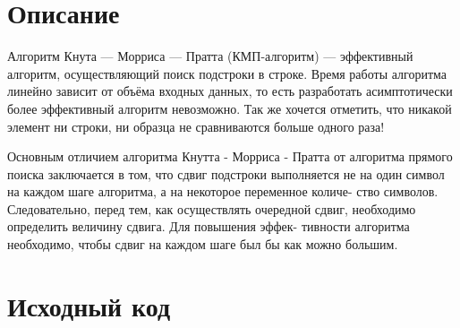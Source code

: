 \section{Описание}

Алгоритм Кнута — Морриса — Пратта (КМП-алгоритм) — эффективный алгоритм, осуществляющий поиск подстроки в строке. Время работы алгоритма линейно зависит от объёма входных данных, то есть разработать асимптотически более эффективный алгоритм невозможно. Так же хочется отметить, что никакой элемент ни строки, ни образца не сравниваются больше одного раза!

Основным отличием алгоритма Кнутта - Морриса - Пратта от алгоритма прямого
поиска заключается в том, что сдвиг подстроки выполняется не на один
символ на каждом шаге алгоритма, а на некоторое переменное количе-
ство символов. Следовательно, перед тем, как осуществлять очередной
сдвиг, необходимо определить величину сдвига. Для повышения эффек-
тивности алгоритма необходимо, чтобы сдвиг на каждом шаге был бы
как можно большим.


\pagebreak

\section{Исходный код}


